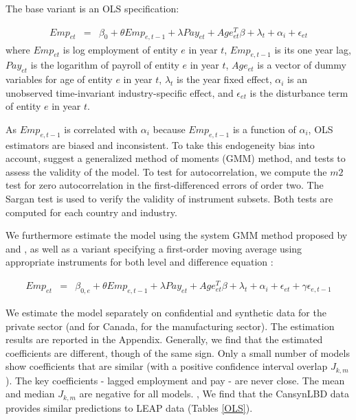 The base variant is an OLS specification:

\begin{eqnarray}	
\label{eq:OLS}
Emp_{et} & = & \beta_0 + \theta Emp_{e,t-1} + \lambda Pay_{et} + Age_{et}^{T}\beta + \lambda_t + \alpha_i + \epsilon_{et}
\end{eqnarray}
where $Emp_{et}$ is log employment of entity $e$ in year $t$, $Emp_{e,t-1}$ is its one year lag, $Pay_{et}$ is the logarithm of payroll of entity $e$ in year $t$, $Age_{et}$ is a vector of dummy variables for age of entity $e$ in year $t$, $\lambda_t$ is the year fixed effect, $\alpha_i$ is an unobserved time-invariant industry-specific effect, and $\epsilon_{et}$ is the disturbance term of entity $e$ in year $t$. 


As $Emp_{e,t-1}$ is correlated with $\alpha_{i}$ because $Emp_{e,t-1}$ is a function of $\alpha_{i}$, 
OLS estimators are biased and inconsistent. 
To take this endogeneity bias into account,  \textcite{RePEc:oup:restud:v:58:y:1991:i:2:p:277-297.} suggest a generalized method of moments (GMM) method, and tests to assess the  validity of the model.  To test for autocorrelation, we compute the  $m2$ test  for zero autocorrelation in the  first-differenced errors of order two. The Sargan test is used to verify the validity of instrument subsets. Both tests are computed for each country and industry.

We furthermore estimate the model using the system GMM  method proposed by \textcite{RePEc:eee:econom:v:68:y:1995:i:1:p:29-51} and \textcite{RePEc:eee:econom:v:87:y:1998:i:1:p:115-143}, as well as a variant specifying a first-order moving average using appropriate instruments for both level and difference equation  \parencite{RePEc:eee:econom:v:68:y:1995:i:1:p:29-51,RePEc:eee:econom:v:87:y:1998:i:1:p:115-143}:

\begin{eqnarray}	
Emp_{et}&=&\beta_{0,e} +\theta Emp_{e,t-1}+\lambda Pay_{et}+Age_{et}^{T}\beta+\lambda_t+\alpha_i+\epsilon_{et}+\gamma\epsilon_{e,t-1}
\end{eqnarray}


We estimate the model separately on confidential and synthetic data for the private sector (and for Canada, for the manufacturing sector). The estimation results are reported in the Appendix. Generally, we find that the estimated coefficients are different, though of the same sign. Only a small number of models show coefficients that are similar (with a positive confidence interval overlap $J_{k,m}$). The key coefficients - lagged employment and pay - are never close. The mean and median $J_{k,m}$ are negative for all models. , We find that the CansynLBD data provides similar predictions to LEAP data (Tables  \ref{OLS}). 

